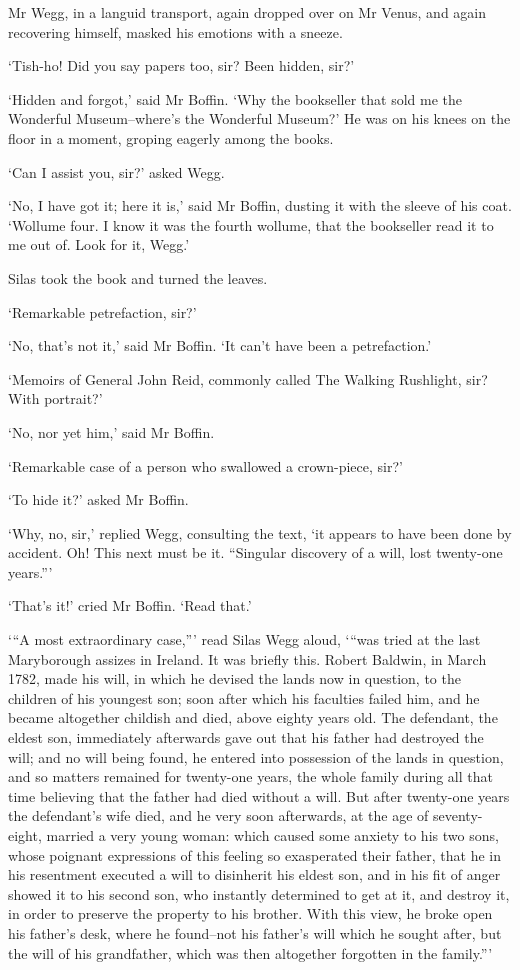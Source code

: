Mr Wegg, in a languid transport, again dropped over on Mr Venus, and
again recovering himself, masked his emotions with a sneeze.

‘Tish-ho! Did you say papers too, sir? Been hidden, sir?’

‘Hidden and forgot,’ said Mr Boffin. ‘Why the bookseller that sold me
the Wonderful Museum--where’s the Wonderful Museum?’ He was on his knees
on the floor in a moment, groping eagerly among the books.

‘Can I assist you, sir?’ asked Wegg.

‘No, I have got it; here it is,’ said Mr Boffin, dusting it with the
sleeve of his coat. ‘Wollume four. I know it was the fourth wollume,
that the bookseller read it to me out of. Look for it, Wegg.’

Silas took the book and turned the leaves.

‘Remarkable petrefaction, sir?’

‘No, that’s not it,’ said Mr Boffin. ‘It can’t have been a
petrefaction.’

‘Memoirs of General John Reid, commonly called The Walking Rushlight,
sir? With portrait?’

‘No, nor yet him,’ said Mr Boffin.

‘Remarkable case of a person who swallowed a crown-piece, sir?’

‘To hide it?’ asked Mr Boffin.

‘Why, no, sir,’ replied Wegg, consulting the text, ‘it appears to have
been done by accident. Oh! This next must be it. “Singular discovery of
a will, lost twenty-one years.”’

‘That’s it!’ cried Mr Boffin. ‘Read that.’

‘“A most extraordinary case,”’ read Silas Wegg aloud, ‘“was tried at
the last Maryborough assizes in Ireland. It was briefly this. Robert
Baldwin, in March 1782, made his will, in which he devised the lands now
in question, to the children of his youngest son; soon after which his
faculties failed him, and he became altogether childish and died, above
eighty years old. The defendant, the eldest son, immediately afterwards
gave out that his father had destroyed the will; and no will being
found, he entered into possession of the lands in question, and so
matters remained for twenty-one years, the whole family during all
that time believing that the father had died without a will. But after
twenty-one years the defendant’s wife died, and he very soon afterwards,
at the age of seventy-eight, married a very young woman: which caused
some anxiety to his two sons, whose poignant expressions of this feeling
so exasperated their father, that he in his resentment executed a will
to disinherit his eldest son, and in his fit of anger showed it to his
second son, who instantly determined to get at it, and destroy it, in
order to preserve the property to his brother. With this view, he broke
open his father’s desk, where he found--not his father’s will which he
sought after, but the will of his grandfather, which was then altogether
forgotten in the family.”’

